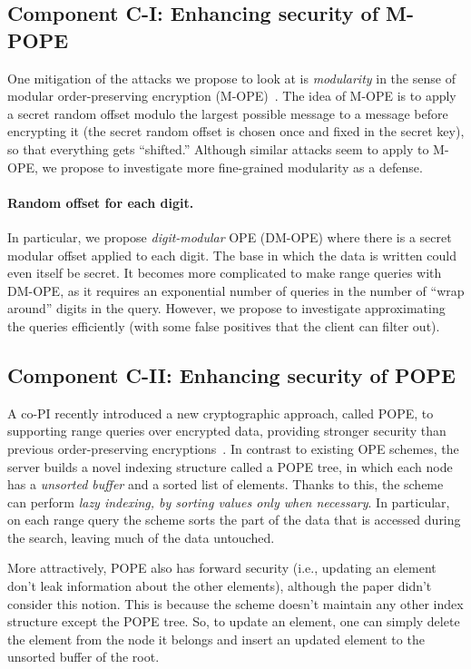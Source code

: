 

\subsection{Component C-I:  Enhancing security of M-POPE}
One mitigation of the attacks we propose to look at is \emph{modularity} in the
sense of modular order-preserving encryption (M-OPE)~\cite{C:BolCheOne11}.  The
idea of M-OPE is to apply a secret random offset modulo the largest possible
message to a message before encrypting it (the secret random offset is chosen
once and fixed in the secret key), so that everything gets ``shifted.''
Although similar attacks seem to apply to M-OPE, we propose to investigate more
fine-grained modularity as a defense. 

\paragraph{Random offset for each digit.}
In particular, we propose \emph{digit-modular} OPE (DM-OPE) where there is a
secret modular offset applied to each digit.  The base in which the data is
written could even itself be secret.  It becomes more complicated to make range
queries with DM-OPE, as it requires an exponential number of queries in the
number of ``wrap around'' digits in the query.  However, we propose to
investigate approximating the queries efficiently (with some false positives
that the client can filter out).


\subsection{Component C-II:  Enhancing security of POPE}
A co-PI recently introduced a new cryptographic approach, called POPE, to
supporting range queries over encrypted data, providing stronger security than
previous order-preserving encryptions~\cite{CCS:RACY16}.  In contrast to
existing OPE schemes, the server builds a novel indexing structure called a
POPE tree, in which each node has a {\it unsorted buffer} and a sorted list of
elements.  Thanks to this, the scheme can perform {\it lazy indexing, by
sorting values only when necessary}. In particular, on each range query the
scheme sorts the part of the data that is accessed during the search, leaving
much of the data untouched.

More attractively, POPE also has forward security (i.e., updating an element
don't leak information about the other elements), although the paper didn't
consider this notion. This is because the scheme doesn't maintain any other
index structure except the POPE tree. So, to update an element, one can simply
delete the element from the node it belongs and insert an updated element to
the unsorted buffer of the root. 

